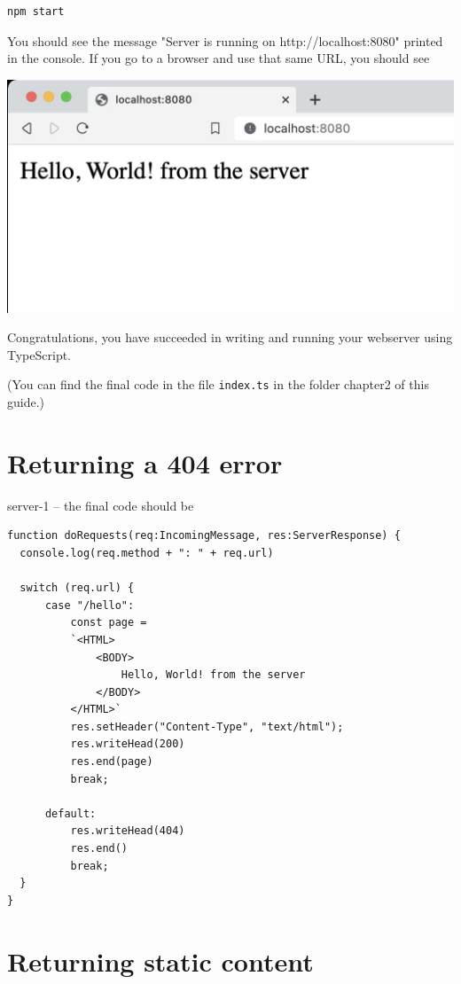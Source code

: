 \documentclass[12pt,a5paper]{memoir}
\begin{document}
\begin{enumerate}
\begin{lstlisting}[language=bash]
npm start
\end{lstlisting}
  
You should see the message "Server is running on http://localhost:8080" printed
  in the console. If you go to a browser and use that same URL, you should see 
  
\includegraphics[width=\linewidth]{WebServer1.jpg}
  
  Congratulations, you have succeeded in writing and running
  your webserver using TypeScript.

  (You can find the final code in the file \texttt{index.ts} in the folder
  chapter2 of this guide.)

\end{enumerate}

\chapter{Returning a 404 error}

server-1 -- the final code should be

\begin{lstlisting}
function doRequests(req:IncomingMessage, res:ServerResponse) {
  console.log(req.method + ": " + req.url)

  switch (req.url) {
      case "/hello":
          const page = 
          `<HTML>
              <BODY>
                  Hello, World! from the server
              </BODY>
          </HTML>`
          res.setHeader("Content-Type", "text/html");
          res.writeHead(200)
          res.end(page)
          break;

      default:
          res.writeHead(404)
          res.end()
          break;
  }
}
\end{lstlisting}

\chapter{Returning static content}
\end{document}
